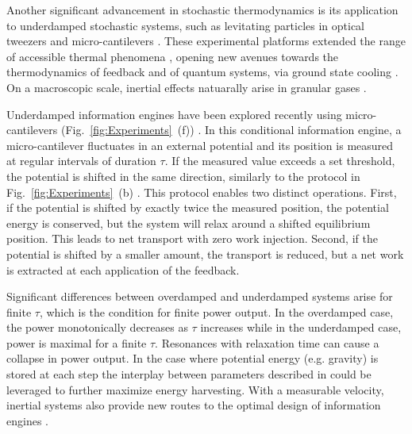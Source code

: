 \documentclass[aps, twocolumn,floatfix,showpacs, superscriptaddress]{revtex4-2}
\newcommand{\ie}{information engines }
\begin{document}
Another significant advancement in stochastic thermodynamics is its application to underdamped stochastic systems, such as levitating particles in optical tweezers \cite{rondin2017direct, gonzalez2021levitodynamics, piotrowski2023simultaneous} and micro-cantilevers \cite{dago2021information, dago2022dynamics, dago2023adiabatic, barros2024probabilistic}. These experimental platforms extended the range of accessible thermal phenomena \cite{rademacher2022nonequilibrium, Dechant2015, rondin2017direct}, opening new avenues towards  the thermodynamics of feedback \cite{debiossac2020thermodynamics} and of quantum systems,  via ground state cooling \cite{Brunelli2018}. On a macroscopic scale, inertial effects natuarally arise in granular gases \cite{puglisi1999kinetic, puglisi2002fluctuation}.

Underdamped \ie have been explored recently using micro-cantilevers (Fig.~\ref{fig:Experiments}~(f)) \cite{archambault2024inertial}.
In this conditional information engine, a micro-cantilever fluctuates in an external potential and its position is measured at regular intervals of duration $\tau$. If the measured value exceeds a set threshold, the potential is shifted in the same direction, similarly to the protocol in Fig.~\ref{fig:Experiments}~(b) \cite{paneru_lossless_2018, lee_experimentally-achieved_2018}. This protocol enables two distinct operations.
First, if the potential is shifted by exactly twice the measured position, the potential energy is conserved, but the system will relax around a shifted equilibrium position. This leads to net transport with zero work injection.
Second, if the potential is shifted by a smaller amount, the transport is reduced, but a net work is extracted at each application of the feedback.

Significant differences between overdamped and underdamped systems arise for finite $\tau$, which is the condition for finite power output. In the overdamped case, the power monotonically decreases as $\tau$ increases \cite{park2016optimal} while in the underdamped case, power is maximal for a finite $\tau$.
Resonances with relaxation time can cause a collapse in power output.
In the case where potential energy (e.g. gravity) is stored at each step \cite{saha2021maximizing} the interplay between parameters described in \cite{archambault2024inertial} could be leveraged to further maximize energy harvesting.
With a measurable velocity, inertial systems also provide new routes to the optimal design of \ie \cite{saha2021maximizing}.
\end{document}
